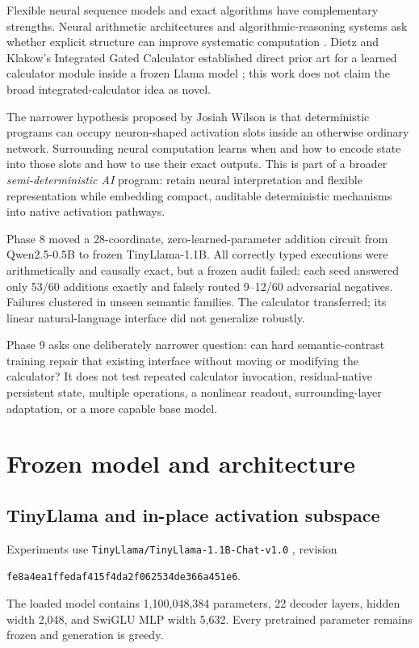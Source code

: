 \documentclass[11pt]{article}
\newcommand{\code}[1]{\texttt{#1}}
\begin{document}
Flexible neural sequence models and exact algorithms have complementary
strengths. Neural arithmetic architectures and algorithmic-reasoning systems
ask whether explicit structure can improve systematic computation
\cite{trask2018,lindner2023,bounsi2024}. Dietz and Klakow's Integrated Gated
Calculator established direct prior art for a learned calculator module inside
a frozen Llama model \cite{dietz2025}; this work does not claim the broad
integrated-calculator idea as novel.

The narrower hypothesis proposed by Josiah Wilson is that deterministic
programs can occupy neuron-shaped activation slots inside an otherwise
ordinary network. Surrounding neural computation learns when and how to encode
state into those slots and how to use their exact outputs. This is part of a
broader \emph{semi-deterministic AI} program: retain neural interpretation and
flexible representation while embedding compact, auditable deterministic
mechanisms into native activation pathways.

Phase 8 moved a 28-coordinate, zero-learned-parameter addition circuit from
Qwen2.5-0.5B to frozen TinyLlama-1.1B. All correctly typed executions were
arithmetically and causally exact, but a frozen audit failed: each seed
answered only 53/60 additions exactly and falsely routed 9--12/60 adversarial
negatives. Failures clustered in unseen semantic families. The calculator
transferred; its linear natural-language interface did not generalize robustly.

Phase 9 asks one deliberately narrower question: can hard semantic-contrast
training repair that existing interface without moving or modifying the
calculator? It does not test repeated calculator invocation, residual-native
persistent state, multiple operations, a nonlinear readout, surrounding-layer
adaptation, or a more capable base model.

\section{Frozen model and architecture}

\subsection{TinyLlama and in-place activation subspace}

Experiments use
\code{TinyLlama/TinyLlama-1.1B-Chat-v1.0} \cite{tinyllama2024}, revision
\begin{sloppypar}
\code{fe8a4ea1ffedaf415f4da2f062534de366a451e6}.
\end{sloppypar}
The loaded model contains 1,100,048,384 parameters, 22 decoder layers, hidden
width 2,048, and SwiGLU MLP width 5,632. Every pretrained parameter remains
frozen and generation is greedy.
\end{document}
